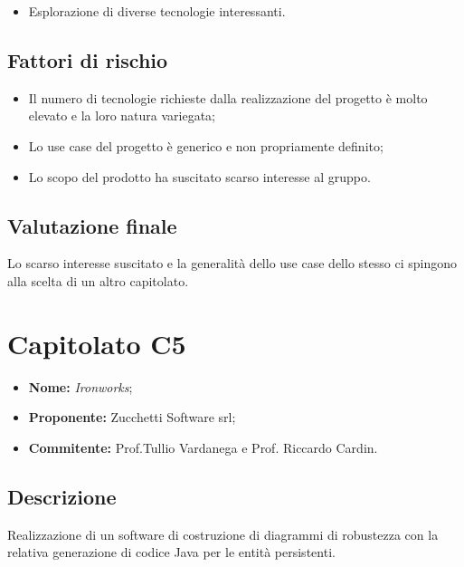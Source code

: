 \documentclass[openany,12pt,a4paper]{report}
\begin{document}
	\begin{itemize}
		
		\item Esplorazione di diverse tecnologie interessanti.
	\end{itemize}
	\subsection{Fattori di rischio}
	
	\begin{itemize}
		\item Il numero di tecnologie richieste dalla realizzazione del progetto è molto elevato e la loro natura variegata;
		
		\item Lo use case del progetto è generico e non propriamente definito;
		
		\item Lo scopo del prodotto ha suscitato scarso interesse al gruppo.
	\end{itemize}
	
	\subsection{Valutazione finale}
	
	Lo scarso interesse suscitato e la generalità dello use case dello stesso ci spingono alla scelta di un altro capitolato.
	
	
	\section{Capitolato C5}
	
	\begin{itemize}
		\item \textbf{Nome:} \textit{Ironworks};
		\item \textbf{Proponente:} Zucchetti Software srl;
		\item \textbf{Commitente:} Prof.Tullio Vardanega e Prof. Riccardo Cardin.
	\end{itemize}
	
	\subsection{Descrizione}
	
	Realizzazione di un software di costruzione di diagrammi di robustezza con la relativa generazione di codice Java per le entità persistenti.
	
\end{document}
